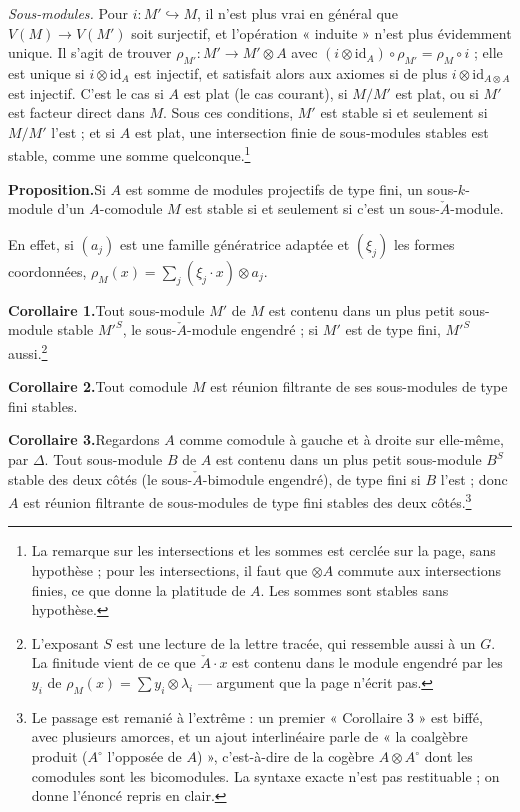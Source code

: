 \documentclass[11pt,a4paper]{article}
\begin{document}
\emph{Sous-modules.} Pour $i \colon M' \hookrightarrow M$, il n'est plus vrai
en général que $V(M) \to V(M')$ soit surjectif, et l'opération « induite »
n'est plus évidemment unique. Il s'agit de trouver
$\rho_{M'} \colon M' \to M' \otimes A$ avec
$(i \otimes \mathrm{id}_{A}) \circ \rho_{M'} = \rho_{M} \circ i$ ; elle est
unique si $i \otimes \mathrm{id}_{A}$ est injectif, et satisfait alors aux
axiomes si de plus $i \otimes \mathrm{id}_{A \otimes A}$ est injectif. C'est
le cas si $A$ est plat (le cas courant), si $M/M'$ est plat, ou si $M'$ est
facteur direct dans $M$. Sous ces conditions, $M'$ est stable si et
seulement si $M/M'$ l'est ; et si $A$ est plat, une intersection finie de
sous-modules stables est stable, comme une somme quelconque.\footnote{La
remarque sur les intersections et les sommes est cerclée sur la page, sans
hypothèse ; pour les intersections, il faut que $\otimes A$ commute aux
intersections finies, ce que donne la platitude de $A$. Les sommes sont
stables sans hypothèse.}

\textbf{Proposition.}\quad Si $A$ est somme de modules projectifs de type fini, un sous-$k$-module d'un
$A$-comodule $M$ est stable si et seulement si c'est un sous-$\check{A}$-module.

En effet, si $(a_{j})$ est une famille génératrice adaptée et $(\xi_{j})$ les
formes coordonnées, $\rho_{M}(x) = \sum_{j} (\xi_{j} \cdot x) \otimes a_{j}$.

\textbf{Corollaire 1.}\quad Tout sous-module $M'$ de $M$ est contenu dans un plus petit sous-module
stable $M'^{S}$, le sous-$\check{A}$-module engendré ; si $M'$ est de type
fini, $M'^{S}$ aussi.\footnote{L'exposant $S$ est une lecture de la lettre
tracée, qui ressemble aussi à un $G$. La finitude vient de ce que
$\check{A} \cdot x$ est contenu dans le module engendré par les $y_{i}$ de
$\rho_{M}(x) = \sum y_{i} \otimes \lambda_{i}$ --- argument que la page
n'écrit pas.}

\textbf{Corollaire 2.}\quad Tout comodule $M$ est réunion filtrante de ses sous-modules de type fini
stables.

\textbf{Corollaire 3.}\quad Regardons $A$ comme comodule à gauche et à droite sur elle-même, par
$\Delta$. Tout sous-module $B$ de $A$ est contenu dans un plus petit
sous-module $B^{S}$ stable des deux côtés (le sous-$\check{A}$-bimodule
engendré), de type fini si $B$ l'est ; donc $A$ est réunion filtrante de
sous-modules de type fini stables des deux côtés.\footnote{Le passage est
remanié à l'extrême : un premier « Corollaire 3 » est biffé, avec plusieurs
amorces, et un ajout interlinéaire parle de « la coalgèbre produit
($A^{\circ}$ l'opposée de $A$) », c'est-à-dire de la cogèbre
$A \otimes A^{\circ}$ dont les comodules sont les bicomodules. La syntaxe
exacte n'est pas restituable ; on donne l'énoncé repris en clair.}
\end{document}
